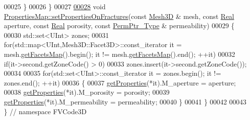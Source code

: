 \begin{DoxyCode}
00025     \}
00026 \}
00027 
\hypertarget{Properties_8cpp_source.tex_l00028}{}\hyperlink{classFVCode3D_1_1PropertiesMap_a3289bc66bb640670a35cd79a7577488d}{00028} \textcolor{keywordtype}{void} \hyperlink{classFVCode3D_1_1PropertiesMap_a3289bc66bb640670a35cd79a7577488d}{PropertiesMap::setPropertiesOnFractures}(\textcolor{keyword}{const} 
      \hyperlink{classFVCode3D_1_1Mesh3D}{Mesh3D} & mesh, \textcolor{keyword}{const} \hyperlink{namespaceFVCode3D_a40c1f5588a248569d80aa5f867080e83}{Real} aperture, \textcolor{keyword}{const} \hyperlink{namespaceFVCode3D_a40c1f5588a248569d80aa5f867080e83}{Real} porosity, \textcolor{keyword}{const} 
      \hyperlink{namespaceFVCode3D_aee5ae48a57366603109f90f526a645b1}{PermPtr\_Type} & permeability)
00029 \{
00030     std::set<UInt> zones;
00031     \textcolor{keywordflow}{for}(std::map<UInt,Mesh3D::Facet3D>::const\_iterator it = mesh.\hyperlink{classFVCode3D_1_1Mesh3D_a76de387da2a552e3e1210d795bc7acf9}{getFacetsMap}().begin(); it != 
      mesh.\hyperlink{classFVCode3D_1_1Mesh3D_a76de387da2a552e3e1210d795bc7acf9}{getFacetsMap}().end(); ++it)
00032         \textcolor{keywordflow}{if}(it->second.getZoneCode() > 0)
00033             zones.insert(it->second.getZoneCode());
00034 
00035     \textcolor{keywordflow}{for}(std::set<UInt>::const\_iterator it = zones.begin(); it != zones.end(); ++it)
00036     \{
00037         \hyperlink{classFVCode3D_1_1PropertiesMap_ace888d15c9a4ab13d5e217a3a565604c}{getProperties}(*it).M\_aperture = aperture;
00038         \hyperlink{classFVCode3D_1_1PropertiesMap_ace888d15c9a4ab13d5e217a3a565604c}{getProperties}(*it).M\_porosity = porosity;
00039         \hyperlink{classFVCode3D_1_1PropertiesMap_ace888d15c9a4ab13d5e217a3a565604c}{getProperties}(*it).M\_permeability = permeability;
00040     \}
00041 \}
00042 
00043 \} \textcolor{comment}{// namespace FVCode3D}
\end{DoxyCode}
